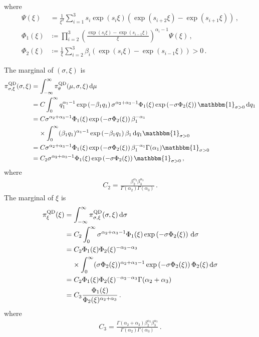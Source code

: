 \documentclass{article}
\newcommand{\dd}{{\rm d}}
\begin{document}
%
where
%
\begin{align*}
	\Psi(\xi) &= \frac{1}{\xi ^ {2}} \sum_{i=1}^3 s_i \exp(s_i \xi)
		(\exp(s_{i + 2} \xi) - \exp(s_{i + 1} \xi)) \,,\\
	\Phi_1(\xi) &\coloneqq \prod^{3}_{i=2} \left(\frac{\exp(s_{i} \xi)
		- \exp(s_{i - 1} \xi)}{\xi}\right) ^ {\alpha_i - 1} \Psi(\xi) \,,\\
	\Phi_2(\xi) &\coloneqq \frac{1}{\xi}
		\sum_{i=2}^3 \beta_i(\exp(s_{i} \xi) - \exp(s_{i - 1} \xi)) > 0 \,.
\end{align*}
%

%
The marginal of $(\sigma, \xi)$ is
%
\begin{align}
	\pi ^ {\text{QD}}_{\sigma, \xi}(\sigma, \xi)
		&= \int_{-\infty}^\infty \pi_{\theta}^{\text{QD}}(\mu, \sigma, \xi)
		\, \dd \mu \nonumber\\
	&=C \int_{0}^\infty q_1 ^ {\alpha_1 - 1} \exp\left(-\beta_1 q_1\right)
		\sigma^{\alpha_2 + \alpha_3 - 1} \Phi_1(\xi)
		\exp\left(-\sigma \Phi_2(\xi)\right)\mathbbm{1}_{\sigma > 0}
		\, \dd q_1 \nonumber\\
	&= C \sigma ^ {\alpha_2 + \alpha_3 - 1} \Phi_1(\xi)
		\exp\left(-\sigma \Phi_2(\xi)\right) \beta_1 ^ {-\alpha_1} \nonumber\\
	&\ \phantom{=} \times \int_{0}^\infty (\beta_1 q_1) ^ {\alpha_1 - 1}
		\exp\left(-\beta_1 q_1\right) \beta_1 \, \dd q_1
		\mathbbm{1}_{\sigma > 0} \nonumber\\
	&= C \sigma ^ {\alpha_2 + \alpha_3 - 1} \Phi_1(\xi)
		\exp\left(-\sigma \Phi_2(\xi)\right) \beta_1 ^ {-\alpha_1}
		\Gamma(\alpha_1) \mathbbm{1}_{\sigma > 0} \nonumber\\
	&= C_2 \sigma ^ {\alpha_2 + \alpha_3 - 1} \Phi_1(\xi)
		\exp\left(-\sigma \Phi_2(\xi)\right) \mathbbm{1}_{\sigma > 0} \,,
	\label{eq:prior-1-xi-sigma}
\end{align}
%
where
%
\begin{align*}
	C_2 = \frac{\beta_2 ^ {\alpha_2} \beta_3 ^ {\alpha_3}}
		{\Gamma(\alpha_2) \Gamma(\alpha_3)} \,.
\end{align*}
%
The marginal of $\xi$ is
%
\begin{align}
	\pi ^ {\text{QD}}_\xi(\xi)
		&= \int_{-\infty}^\infty \pi^{\text{QD}}_{\sigma, \xi}(\sigma, \xi)
		\, \dd \sigma \nonumber\\
	&=C_2 \int_{0}^\infty \sigma ^ {\alpha_2 + \alpha_3 - 1} \Phi_1(\xi)
		\exp\left(-\sigma \Phi_2(\xi)\right) \, \dd \sigma \nonumber\\
	&=C_2 \Phi_1(\xi) \Phi_2(\xi) ^ {-\alpha_2 - \alpha_3} \nonumber\\
	&\ \phantom{=} \times \int_{0}^\infty (\sigma \Phi_2(\xi))
		^ {\alpha_2 + \alpha_3 - 1} \exp\left(-\sigma \Phi_2(\xi)\right)
		\Phi_2(\xi) \, \dd \sigma \nonumber\\
	&= C_2 \Phi_1(\xi) \Phi_2(\xi) ^ {-\alpha_2 - \alpha_3}
		\Gamma(\alpha_2 + \alpha_3) \nonumber\\
	&=C_3 \frac{\Phi_1(\xi)}{\Phi_2(\xi) ^ {\alpha_2 + \alpha_3}} \,.
	\label{eq:prior-1-xi}
\end{align}
%
where
%
\begin{align*}
	C_3 = \frac{\Gamma(\alpha_2 + \alpha_3) \beta_2 ^ {\alpha_2}
		\beta_3 ^ {\alpha_3}} {\Gamma(\alpha_2) \Gamma(\alpha_3)} \,.
\end{align*}
%
\end{document}

